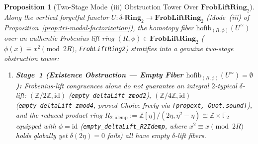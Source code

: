 \documentclass[10pt,twoside,openright]{book}
\theoremstyle{crmplain}
\newtheorem{proposition}[theorem]{Proposition}
\theoremstyle{crmdef}
\theoremstyle{crmremark}
\newcommand{\lean}[1]{\ignorespaces}
\newcommand{\leanwitness}{\ignorespaces}
\begin{document}
\begin{proposition}[Two-Stage Mode~(iii) Obstruction Tower Over $\mathbf{FrobLiftRing}_2$]\label{prop:delta-three-stage-tower}%
\lean{HomotopyCRM.r2_aut_unique, HomotopyCRM.deltaRing2_sub_frobDerivation2, HomotopyCRM.r2Delta0_not_iso_r2Delta1, HomotopyCRM.empty_deltaLift_zmod2, HomotopyCRM.empty_deltaLift_zmod4, HomotopyCRM.empty_deltaLift_R2Idemp, HomotopyCRM.r2_lift_card_eq_two, HomotopyCRM.r2_lifts_non_iso, HomotopyCRM.r22_lift_card_eq_sixteen, HomotopyCRM.r22_iso_orbits_eq_six}%
\leanwitness%
%
Along the vertical forgetful functor $U : \delta\text{-}\mathbf{Ring}_2 \to \mathbf{FrobLiftRing}_2$ (Mode~(iii) of Proposition~\ref{prop:tri-modal-factorization}), the homotopy fiber $\mathrm{hofib}_{(R,\phi)}(U^{\simeq})$ over an authentic Frobenius-lift ring $(R, \phi) \in \mathbf{FrobLiftRing}_2$ ($\phi(x) \equiv x^2 \pmod{2R}$, \texttt{FrobLiftRing2}) stratifies into a genuine two-stage obstruction tower:
\begin{enumerate}[label=\textup{(\arabic*)},leftmargin=2.0em]
  \item \textbf{Stage~1 (Existence Obstruction — Empty Fiber $\mathrm{hofib}_{(R,\phi)}(U^{\simeq}) = \emptyset$):} Frobenius-lift congruences alone do not guarantee an integral $2$-typical $\delta$-lift: $(\mathbb{Z}/2\mathbb{Z}, \mathrm{id})$ (\texttt{empty\_\allowbreak deltaLift\_\allowbreak zmod2}), $(\mathbb{Z}/4\mathbb{Z}, \mathrm{id})$ (\texttt{empty\_\allowbreak deltaLift\_\allowbreak zmod4}, proved Choice-freely via \texttt{[propext, Quot.sound]}), and the reduced product ring $R_{2,\mathrm{idemp}} := \mathbb{Z}[\eta]/(2\eta, \eta^2 - \eta) \cong \mathbb{Z} \times \mathbb{F}_2$ equipped with $\phi = \mathrm{id}$ (\texttt{empty\_\allowbreak deltaLift\_\allowbreak R2Idemp}, where $x^2 \equiv x \pmod{2R}$ holds globally yet $\delta(2\eta)=0$ fails) all have empty $\delta$-lift fibers.

\end{enumerate}
\end{proposition}
\end{document}
